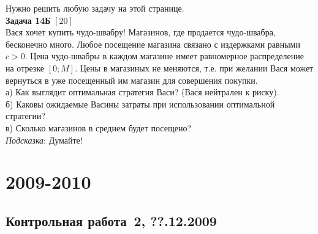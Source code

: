 \documentclass[pdftex,12pt,a4paper]{article}
\begin{document}
Нужно решить любую \textbf{} задачу на этой странице. \\


\textbf{Задача 14Б} $[20]$ \\
Вася хочет купить чудо-швабру! Магазинов, где продается чудо-швабра, бесконечно много. Любое посещение магазина связано с издержками равными $c>0$. Цена чудо-швабры в каждом магазине имеет равномерное распределение на отрезке $[0;M]$. Цены в магазиных не меняются, т.е. при желании Вася может вернуться в уже посещенный им магазин для совершения покупки.\\
а) Как выглядит оптимальная стратегия Васи? (Вася нейтрален к риску). \\
б) Каковы ожидаемые Васины затраты при использовании оптимальной стратегии? \\
в) Сколько магазинов в среднем будет посещено? \\


\emph{Подсказка}: Думайте! \\



\section{2009-2010}

\subsection{Контрольная работа \No\,2, ??.12.2009}
\end{document}
